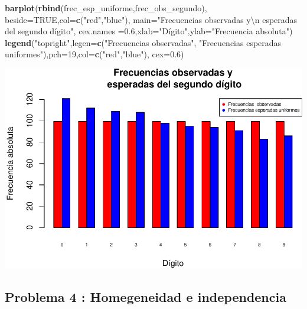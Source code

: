\documentclass[
]{article}
\newenvironment{Shaded}{\begin{snugshade}}{\end{snugshade}}
\newcommand{\CharTok}[1]{\textcolor[rgb]{0.31,0.60,0.02}{#1}}
\newcommand{\DataTypeTok}[1]{\textcolor[rgb]{0.13,0.29,0.53}{#1}}
\newcommand{\DecValTok}[1]{\textcolor[rgb]{0.00,0.00,0.81}{#1}}
\newcommand{\FloatTok}[1]{\textcolor[rgb]{0.00,0.00,0.81}{#1}}
\newcommand{\KeywordTok}[1]{\textcolor[rgb]{0.13,0.29,0.53}{\textbf{#1}}}
\newcommand{\NormalTok}[1]{#1}
\newcommand{\OtherTok}[1]{\textcolor[rgb]{0.56,0.35,0.01}{#1}}
\newcommand{\StringTok}[1]{\textcolor[rgb]{0.31,0.60,0.02}{#1}}
\begin{document}
\begin{Shaded}
\begin{Highlighting}[]
\KeywordTok{barplot}\NormalTok{(}\KeywordTok{rbind}\NormalTok{(frec\_esp\_uniforme,frec\_obs\_segundo),}
        \DataTypeTok{beside=}\OtherTok{TRUE}\NormalTok{,}\DataTypeTok{col=}\KeywordTok{c}\NormalTok{(}\StringTok{"red"}\NormalTok{,}\StringTok{"blue"}\NormalTok{),}
        \DataTypeTok{main=}\StringTok{"Frecuencias observadas y}\CharTok{\textbackslash{}n}\StringTok{ esperadas del segundo dígito"}\NormalTok{,}
        \DataTypeTok{cex.names =}\FloatTok{0.6}\NormalTok{,}\DataTypeTok{xlab=}\StringTok{"Dígito"}\NormalTok{,}\DataTypeTok{ylab=}\StringTok{"Frecuencia absoluta"}\NormalTok{)}
\KeywordTok{legend}\NormalTok{(}\StringTok{"topright"}\NormalTok{,}\DataTypeTok{legen=}\KeywordTok{c}\NormalTok{(}\StringTok{"Frecuencias  observadas"}\NormalTok{,}
                          \StringTok{"Frecuencias esperadas uniformes"}\NormalTok{),}\DataTypeTok{pch=}\DecValTok{19}\NormalTok{,}\DataTypeTok{col=}\KeywordTok{c}\NormalTok{(}\StringTok{"red"}\NormalTok{,}\StringTok{"blue"}\NormalTok{),}
       \DataTypeTok{cex=}\FloatTok{0.6}\NormalTok{)}
\end{Highlighting}
\end{Shaded}

\includegraphics{taller_problemas_resueltos_extra_1_files/figure-latex/unnamed-chunk-15-2.pdf}

\hypertarget{problema-4-homegeneidad-e-independencia}{%
\subsection{Problema 4 : Homegeneidad e
independencia}\label{problema-4-homegeneidad-e-independencia}}
\end{document}
